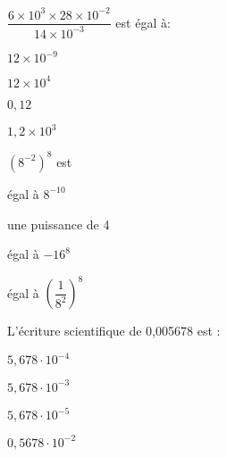 



\begin{QCM}
  \begin{GroupeQCM} 
    \begin{exercice}
      $\dfrac{6\times 10^3 \times 28 \times 10^{-2}}{14 \times 10^{-3}}$ est égal à:
      \begin{ChoixQCM}{4}
      \item $12 \times 10^{-9}$
      \item $12 \times 10^{4}$
      \item $0,12$
      \item $1,2 \times 10^{3}$
      \end{ChoixQCM}
\begin{corrige}
   \end{corrige}
    \end{exercice}

    \begin{exercice}
      $(8^{-2})^8$ est
      \begin{ChoixQCM}{4}
      \item égal à $8^{-10}$
      \item une puissance de 4
      \item égal à $-16^8$
      \item égal à $\left( \dfrac{1}{8^2}\right)^8$
      \end{ChoixQCM}
      \begin{corrige}
   \end{corrige}
    \end{exercice}

    
    \begin{exercice}
      L'écriture scientifique de 0,005678 est :
      \begin{ChoixQCM}{4}
      \item $5,678\cdot 10^{-4}$
      \item $5,678\cdot 10^{-3}$
      \item $5,678\cdot 10^{-5}$
      \item $0,5678\cdot 10^{-2}$
      \end{ChoixQCM}
      \begin{corrige}
   \end{corrige}
    \end{exercice}



\end{GroupeQCM}
\end{QCM}
